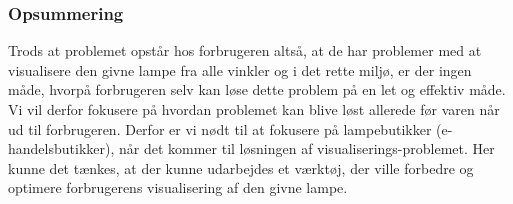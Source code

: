 \subsubsection*{Opsummering}
Trods at problemet opstår hos forbrugeren altså, at de har problemer med at visualisere den givne lampe fra alle vinkler og i det rette miljø, er der ingen måde, hvorpå forbrugeren selv kan løse dette problem på en let og effektiv måde. Vi vil derfor fokusere på hvordan problemet kan blive løst allerede før varen når ud til forbrugeren. Derfor er vi nødt til at fokusere på lampebutikker (e-handelsbutikker), når det kommer til løsningen af visualiserings-problemet. Her kunne det tænkes, at der kunne udarbejdes et værktøj, der ville forbedre og optimere forbrugerens visualisering af den givne lampe.
